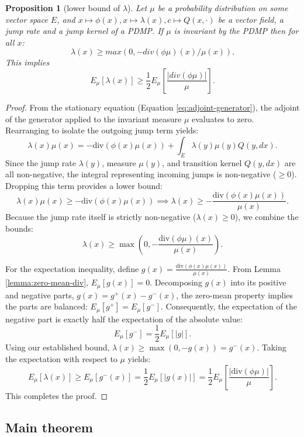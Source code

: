 \documentclass{article}
\newtheorem{proposition}{Proposition}
\begin{document}
\begin{proposition}[lower bound of $\lambda$]
    \label{prop:lower-bound}
    Let $\mu$ be a probability distribution on some vector space $E$, and $x\mapsto \phi(x), x \mapsto \lambda(x), c\mapsto Q(x,\cdot)$ be a vector field, a jump rate and a jump kernel of a PDMP. If $\mu$ is invariant by the PDMP then for all $x$:
    \[
        \lambda(x) \geq max(0, -div(\phi \mu)(x) / \mu(x)). 
    \]
    This implies
    \[
        E_\mu[\lambda(x)] \geq \frac{1}{2} E_\mu[\frac{|div(\phi \mu)|}{\mu}].
    \]
\end{proposition}
\begin{proof}
    From the stationary equation (Equation \ref{eq:adjoint-generator}), the adjoint of the generator applied to the invariant measure $\mu$ evaluates to zero.
    Rearranging to isolate the outgoing jump term yields:
    \[
        \lambda(x)\mu(x) = -\text{div}(\phi(x)\mu(x)) + \int_E \lambda(y) \mu(y) Q(y, dx).
    \]
    Since the jump rate $\lambda(y)$, measure $\mu(y)$, and transition kernel $Q(y, dx)$ are all non-negative, the integral representing incoming jumps is non-negative ($\geq 0$). Dropping this term provides a lower bound:
    \[
        \lambda(x)\mu(x) \geq -\text{div}(\phi(x)\mu(x)) \implies \lambda(x) \geq -\frac{\text{div}(\phi(x)\mu(x))}{\mu(x)}.
    \]
    Because the jump rate itself is strictly non-negative ($\lambda(x) \geq 0$), we combine the bounds:
    \[
        \lambda(x) \geq \max\left(0, -\frac{\text{div}(\phi \mu)(x)}{\mu(x)}\right).
    \]
    
    For the expectation inequality, define $g(x) = \frac{\text{div}(\phi(x)\mu(x))}{\mu(x)}$. From Lemma \ref{lemma:zero-mean-div}, $E_\mu[g(x)] = 0$. 
    Decomposing $g(x)$ into its positive and negative parts, $g(x) = g^+(x) - g^-(x)$, the zero-mean property implies the parts are balanced: $E_\mu[g^+] = E_\mu[g^-]$. Consequently, the expectation of the negative part is exactly half the expectation of the absolute value: 
    \[
        E_\mu[g^-] = \frac{1}{2} E_\mu[|g|].
    \]
    Using our established bound, $\lambda(x) \geq \max(0, -g(x)) = g^-(x)$. Taking the expectation with respect to $\mu$ yields:
    \[
        E_\mu[\lambda(x)] \geq E_\mu[g^-(x)] = \frac{1}{2} E_\mu[|g(x)|] = \frac{1}{2} E_\mu\left[\frac{|\text{div}(\phi \mu)|}{\mu}\right].
    \]
    This completes the proof.
\end{proof}




\subsection{Main theorem}
\end{document}
